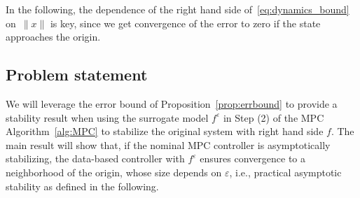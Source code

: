 \documentclass{article}
\numberwithin{equation}{section}
\begin{document}
	\noindent In the following, the dependence of the right hand side of~\eqref{eq:dynamics_bound} on~$\|x\|$ is key, since we get convergence of the error to zero if the state approaches the origin.
	
	
	
	\subsection{Problem statement}
	\label{subsec:problem}
	
	We will leverage the error bound of Proposition~\ref{prop:errbound} to provide a stability result when using the surrogate model $f^\varepsilon$ in Step (2) of the MPC Algorithm~\ref{alg:MPC} to stabilize the original system with right hand side $f$. 
	The main result will show that, if the nominal MPC controller is asymptotically stabilizing, the data-based controller with $f^\varepsilon$ ensures convergence to a neighborhood of the origin, whose size depends on $\varepsilon$, i.e., practical asymptotic stability as defined in the following. 
	
\end{document}
